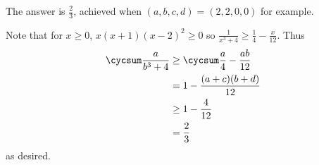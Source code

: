 The answer is $\frac{2}{3}$, achieved when $(a,b,c,d)=(2,2,0,0)$ for example.

Note that for $x\geq0$, $x(x+1)(x-2)^2\geq0$ so $\frac{1}{x^3+4}\geq\frac{1}{4}-\frac{x}{12}$. Thus
\begin{align*}
	\cycsum\frac{a}{b^3+4}&\geq\cycsum\frac{a}{4}-\frac{ab}{12}\\
	&=1-\frac{(a+c)(b+d)}{12}\\
	&\geq1-\frac{4}{12}\\
	&=\frac{2}{3}
\end{align*}
as desired.